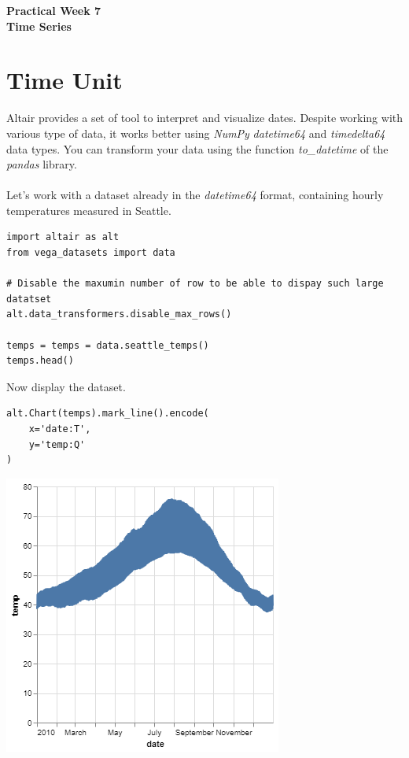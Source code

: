 \documentclass[11pt]{article}
\begin{document}
\pagestyle{fancy}
\renewcommand{\headrulewidth}{0pt}

\begin{center}
\vspace*{1cm}
{\textbf {\Huge Practical Week 7}}\\
\vspace*{0.5cm}
{\textbf {\huge Time Series}}
\vspace*{1cm}
\end{center}

\section{Time Unit}

Altair provides a set of tool to interpret and visualize dates. Despite working with various type of data, it works better using \textit{NumPy} \textit{datetime64} and \textit{timedelta64} data types. You can transform your data using the function \textit{to\_datetime} of the \textit{pandas} library.\\
\\
Let's work with a dataset already in the \textit{datetime64} format, containing hourly temperatures measured in Seattle.

\begin{verbatim}
import altair as alt
from vega_datasets import data

# Disable the maxumin number of row to be able to dispay such large datatset
alt.data_transformers.disable_max_rows()

temps = temps = data.seattle_temps()
temps.head()
\end{verbatim}

Now display the dataset.

\begin{verbatim}
alt.Chart(temps).mark_line().encode(
    x='date:T',
    y='temp:Q'
)
\end{verbatim}

\begin{center}
\includegraphics[width=.5\textwidth]{visualization (1).png}
\end{center}
\end{document}
